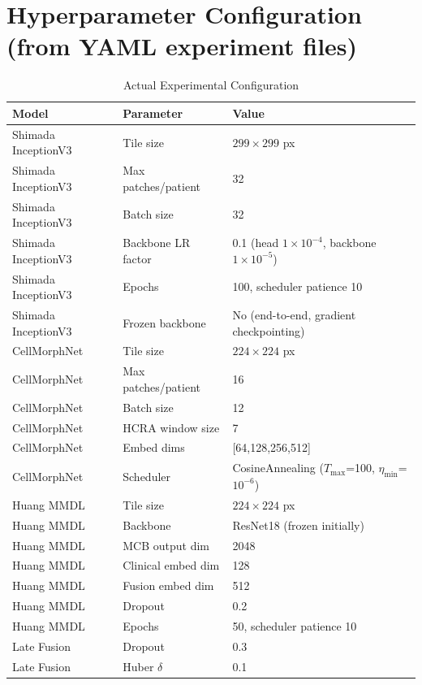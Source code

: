 \documentclass[11pt,a4paper]{article}
\begin{document}
\appendix
\section{Hyperparameter Configuration (from YAML experiment files)}
\label{app:hyperparams}
\begin{table}[H]
\centering
\caption{Actual Experimental Configuration}
\small
\begin{tabular}{|l|l|l|}
\hline
\textbf{Model} & \textbf{Parameter} & \textbf{Value} \\
\hline
Shimada InceptionV3 & Tile size & $299\times299$ px \\
Shimada InceptionV3 & Max patches/patient & 32 \\
Shimada InceptionV3 & Batch size & 32 \\
Shimada InceptionV3 & Backbone LR factor & 0.1 (head $1\times10^{-4}$, backbone $1\times10^{-5}$) \\
Shimada InceptionV3 & Epochs & 100, scheduler patience 10 \\
Shimada InceptionV3 & Frozen backbone & No (end-to-end, gradient checkpointing) \\
CellMorphNet & Tile size & $224\times224$ px \\
CellMorphNet & Max patches/patient & 16 \\
CellMorphNet & Batch size & 12 \\
CellMorphNet & HCRA window size & 7 \\
CellMorphNet & Embed dims & [64,128,256,512] \\
CellMorphNet & Scheduler & CosineAnnealing ($T_{\max}$=100, $\eta_{\min}$=$10^{-6}$) \\
Huang MMDL & Tile size & $224\times224$ px \\
Huang MMDL & Backbone & ResNet18 (frozen initially) \\
Huang MMDL & MCB output dim & 2048 \\
Huang MMDL & Clinical embed dim & 128 \\
Huang MMDL & Fusion embed dim & 512 \\
Huang MMDL & Dropout & 0.2 \\
Huang MMDL & Epochs & 50, scheduler patience 10 \\
Late Fusion & Dropout & 0.3 \\
Late Fusion & Huber $\delta$ & 0.1 \\

\end{tabular}
\end{table}
\end{document}
